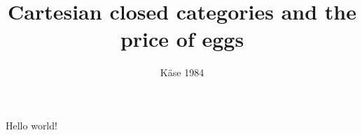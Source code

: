 \documentclass{article}
\title{Cartesian closed categories and the price of eggs}
\author{\VAR{name}}
\date{Käse 1984}
\begin{document}
   \maketitle
   Hello world!
\end{document}
